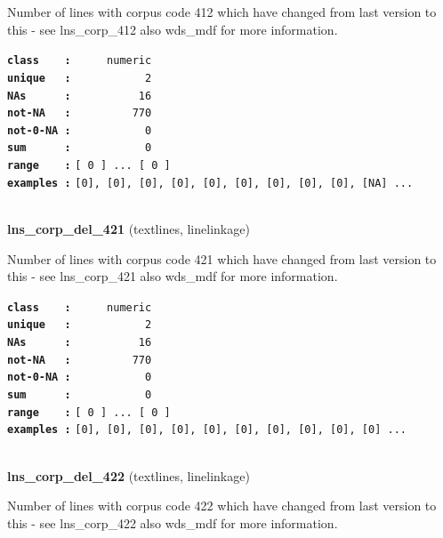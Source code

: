 \documentclass[]{article}
\begin{document}
Number of lines with corpus code 412 which have changed from last
version to this - see lns\_corp\_412 also wds\_mdf for more information.

\textbf{\texttt{class\ \ \ \ :}} \texttt{~~~~~numeric}\\
\textbf{\texttt{unique\ \ \ :}} \texttt{~~~~~~~~~~~2}\\
\textbf{\texttt{NAs\ \ \ \ \ \ :}} \texttt{~~~~~~~~~~16}\\
\textbf{\texttt{not-NA\ \ \ :}} \texttt{~~~~~~~~~770}\\
\textbf{\texttt{not-0-NA\ :}} \texttt{~~~~~~~~~~~0}\\
\textbf{\texttt{sum\ \ \ \ \ \ :}} \texttt{~~~~~~~~~~~0}\\
\textbf{\texttt{range\ \ \ \ :}}
\texttt{{[}\ 0\ {]}\ ...\ {[}\ 0\ {]}}\\
\textbf{\texttt{examples\ :}}
\texttt{{[}0{]},\ {[}0{]},\ {[}0{]},\ {[}0{]},\ {[}0{]},\ {[}0{]},\ {[}0{]},\ {[}0{]},\ {[}0{]},\ {[}NA{]}\ ...}\\

~

\textbf{lns\_corp\_del\_421} (textlines, linelinkage)

Number of lines with corpus code 421 which have changed from last
version to this - see lns\_corp\_421 also wds\_mdf for more information.

\textbf{\texttt{class\ \ \ \ :}} \texttt{~~~~~numeric}\\
\textbf{\texttt{unique\ \ \ :}} \texttt{~~~~~~~~~~~2}\\
\textbf{\texttt{NAs\ \ \ \ \ \ :}} \texttt{~~~~~~~~~~16}\\
\textbf{\texttt{not-NA\ \ \ :}} \texttt{~~~~~~~~~770}\\
\textbf{\texttt{not-0-NA\ :}} \texttt{~~~~~~~~~~~0}\\
\textbf{\texttt{sum\ \ \ \ \ \ :}} \texttt{~~~~~~~~~~~0}\\
\textbf{\texttt{range\ \ \ \ :}}
\texttt{{[}\ 0\ {]}\ ...\ {[}\ 0\ {]}}\\
\textbf{\texttt{examples\ :}}
\texttt{{[}0{]},\ {[}0{]},\ {[}0{]},\ {[}0{]},\ {[}0{]},\ {[}0{]},\ {[}0{]},\ {[}0{]},\ {[}0{]},\ {[}0{]}\ ...}\\

~

\textbf{lns\_corp\_del\_422} (textlines, linelinkage)

Number of lines with corpus code 422 which have changed from last
version to this - see lns\_corp\_422 also wds\_mdf for more information.
\end{document}
